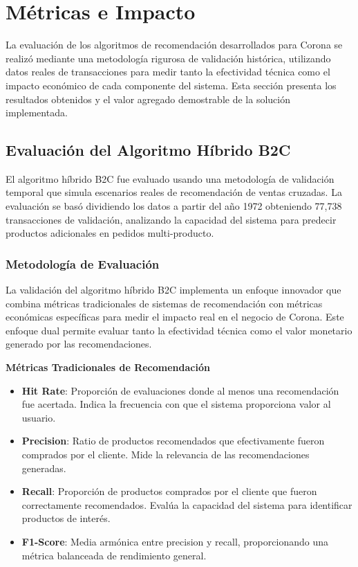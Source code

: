 \documentclass[twocolumn]{article}
\begin{document}
\section{Métricas e Impacto}

La evaluación de los algoritmos de recomendación desarrollados para Corona se realizó mediante una metodología rigurosa de validación histórica, utilizando datos reales de transacciones para medir tanto la efectividad técnica como el impacto económico de cada componente del sistema. Esta sección presenta los resultados obtenidos y el valor agregado demostrable de la solución implementada.

\subsection{Evaluación del Algoritmo Híbrido B2C}

El algoritmo híbrido B2C fue evaluado usando una metodología de validación temporal que simula escenarios reales de recomendación de ventas cruzadas. La evaluación se basó dividiendo los datos a partir del año 1972 obteniendo  77,738 transacciones de validación, analizando la capacidad del sistema para predecir productos adicionales en pedidos multi-producto.

\subsubsection{Metodología de Evaluación}

La validación del algoritmo híbrido B2C implementa un enfoque innovador que combina métricas tradicionales de sistemas de recomendación con métricas económicas específicas para medir el impacto real en el negocio de Corona. Este enfoque dual permite evaluar tanto la efectividad técnica como el valor monetario generado por las recomendaciones.

\textbf{Métricas Tradicionales de Recomendación}

\begin{itemize}
    \item \textbf{Hit Rate}: Proporción de evaluaciones donde al menos una recomendación fue acertada. Indica la frecuencia con que el sistema proporciona valor al usuario.
    \item \textbf{Precision}: Ratio de productos recomendados que efectivamente fueron comprados por el cliente. Mide la relevancia de las recomendaciones generadas.
    \item \textbf{Recall}: Proporción de productos comprados por el cliente que fueron correctamente recomendados. Evalúa la capacidad del sistema para identificar productos de interés.
    \item \textbf{F1-Score}: Media armónica entre precision y recall, proporcionando una métrica balanceada de rendimiento general.
\end{itemize}
\end{document}
